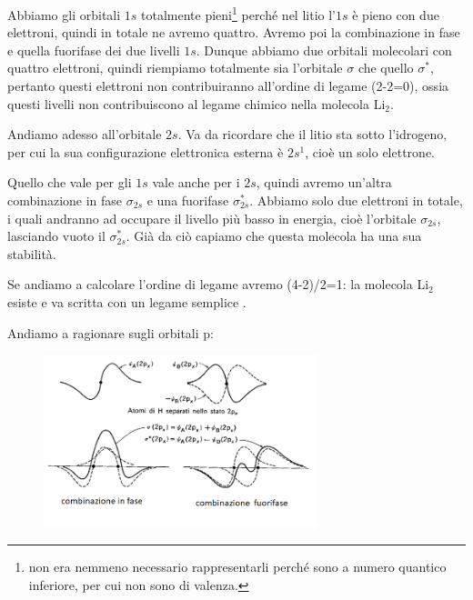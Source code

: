 Abbiamo gli orbitali $1s$ totalmente pieni\footnote{non era nemmeno necessario rappresentarli perché sono a numero quantico inferiore, per cui non sono di valenza.} perché nel litio l'$1s$ è pieno con due elettroni, quindi in totale ne avremo quattro. Avremo poi la combinazione in fase e quella fuorifase dei due livelli $1s$. Dunque abbiamo due orbitali molecolari con quattro elettroni, quindi riempiamo totalmente sia l'orbitale $\sigma$ che quello $\sigma^*$, pertanto questi elettroni non contribuiranno all'ordine di legame (2-2=0), ossia questi livelli non contribuiscono al legame chimico nella molecola Li$_2$.

\vspace{0.2cm}Andiamo adesso all'orbitale $2s$. Va da ricordare che il litio sta sotto l'idrogeno, per cui la sua configurazione elettronica esterna è $2s^1$, cioè un solo elettrone.

Quello che vale per gli $1s$ vale anche per i $2s$, quindi avremo un'altra combinazione in fase $\sigma_{2s}$ e una fuorifase $\sigma_{2s}^*$. Abbiamo solo due elettroni in totale, i quali andranno ad occupare il livello più basso in energia, cioè l'orbitale $\sigma_{2s}$, lasciando vuoto il $\sigma_{2s}^*$. Già da ciò capiamo che questa molecola ha una sua stabilità.

Se andiamo a calcolare l'ordine di legame avremo (4-2)/2=1: la molecola Li$_2$ esiste e va scritta con un legame semplice .

\vspace{0.2cm}Andiamo a ragionare sugli orbitali p:

\begin{figure}[htp]
    \centering
    \includegraphics[width=8cm]{immagini/orbitali_molecolari_pigreco.png}
\end{figure}

